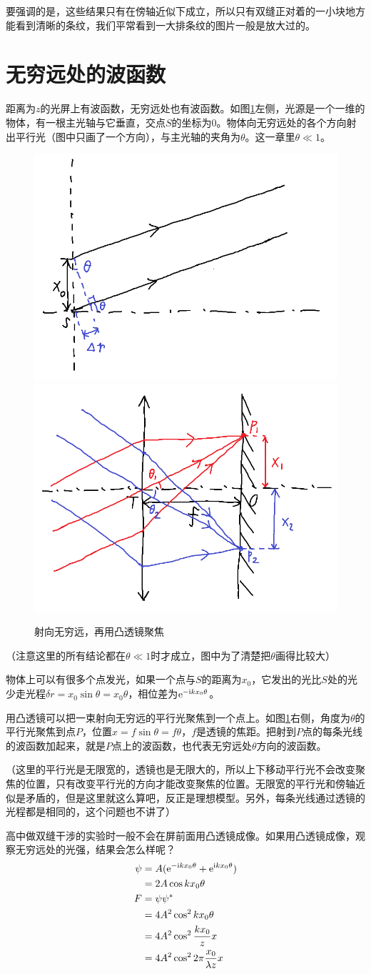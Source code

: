 要强调的是，这些结果只有在傍轴近似下成立，所以只有双缝正对着的一小块地方能看到清晰的条纹，我们平常看到一大排条纹的图片一般是放大过的。
\section{无穷远处的波函数}
距离为$z$的光屏上有波函数，无穷远处也有波函数。如图\ref{fig-wave-amp-inf}左侧，光源是一个一维的物体，有一根主光轴与它垂直，交点$S$的坐标为$0$。物体向无穷远处的各个方向射出平行光（图中只画了一个方向），与主光轴的夹角为$\theta$。这一章里$\theta \ll 1$。
\begin{figure}[htb]
\centering
\includegraphics[width=0.33\linewidth]{fig/wave-amp-inf.png}
\includegraphics[width=0.33\linewidth]{fig/conv-lens.png}
\caption{射向无穷远，再用凸透镜聚焦}
\label{fig-wave-amp-inf}
\end{figure}

（注意这里的所有结论都在$\theta \ll 1$时才成立，图中为了清楚把$\theta$画得比较大）

物体上可以有很多个点发光，如果一个点与$S$的距离为$x_0$，它发出的光比$S$处的光少走光程$\delta r=x_0 \sin \theta=x_0 \theta$，相位差为$\mathrm{e}^{-\mathrm{i} k x_0 \theta}$。

用凸透镜可以把一束射向无穷远的平行光聚焦到一个点上。如图\ref{fig-wave-amp-inf}右侧，角度为$\theta$的平行光聚焦到点$P$，位置$x=f \sin \theta=f \theta$，$f$是透镜的焦距。把射到$P$点的每条光线的波函数加起来，就是$P$点上的波函数，也代表无穷远处$\theta$方向的波函数。

（这里的平行光是无限宽的，透镜也是无限大的，所以上下移动平行光不会改变聚焦的位置，只有改变平行光的方向才能改变聚焦的位置。无限宽的平行光和傍轴近似是矛盾的，但是这里就这么算吧，反正是理想模型。另外，每条光线通过透镜的光程都是相同的，这个问题也不讲了）

高中做双缝干涉的实验时一般不会在屏前面用凸透镜成像。如果用凸透镜成像，观察无穷远处的光强，结果会怎么样呢？
\begin{align*}
\psi&=A(\mathrm{e}^{-\mathrm{i} k x_0 \theta}+\mathrm{e}^{\mathrm{i} k x_0 \theta}) \\
&=2 A \cos k x_0 \theta \\
F&=\psi \psi^* \\
&=4 A^2 \cos^2 k x_0 \theta \\
&=4 A^2 \cos^2 \frac{k x_0}{z} x \\
&=4 A^2 \cos^2 2 \pi \frac{x_0}{\lambda z} x
\end{align*}

